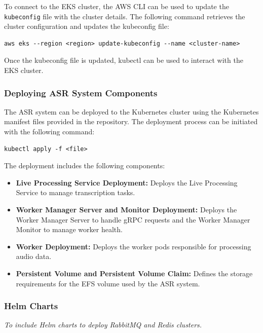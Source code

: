 To connect to the EKS cluster, the AWS CLI can be used to update the \texttt{kubeconfig} file with the cluster details. The following command retrieves the cluster configuration and updates the kubeconfig file:
\begin{verbatim}
aws eks --region <region> update-kubeconfig --name <cluster-name>
\end{verbatim}

Once the kubeconfig file is updated, kubectl can be used to interact with the EKS cluster.

\subsubsection{Deploying ASR System Components}
The ASR system can be deployed to the Kubernetes cluster using the Kubernetes manifest files provided in the repository. The deployment process can be initiated with the following command:
\begin{verbatim}
kubectl apply -f <file>
\end{verbatim}

The deployment includes the following components:
\begin{itemize}
    \item \textbf{Live Processing Service Deployment:} Deploys the Live Processing Service to manage transcription tasks.
    \item \textbf{Worker Manager Server and Monitor Deployment:} Deploys the Worker Manager Server to handle gRPC requests and the Worker Manager Monitor to manage worker health.
    \item \textbf{Worker Deployment:} Deploys the worker pods responsible for processing audio data.
    \item \textbf{Persistent Volume and Persistent Volume Claim:}  Defines the storage requirements for the EFS  volume used by the ASR system.
\end{itemize}



\subsubsection{Helm Charts}
\textit{To include Helm charts to deploy RabbitMQ and Redis clusters.}

